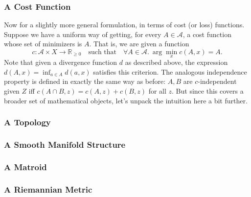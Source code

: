 \documentclass{article}
\begin{document}
\bigskip


\subsubsection*{A Cost Function}
Now for a slightly more general formulation, in terms of cost (or loss) functions.
Suppose we have a uniform way of getting, for every $A \in \mathcal A$, a cost function whose set of minimizers is $A$. That is, we are given a function
\[ c : \mathcal A \times X \to \mathbb R_{\ge 0}
\quad\text{such that}\quad
\forall A \in \mathcal A.~\arg\min_{x} c(A, x) = A.
\]
Note that given a divergence function $d$ as described above, the expression $d(A, x) = \inf_{a \in A} d(a,x)$ satisfies this criterion. The analogous independence property is defined in exactly the same way as before:
$A, B$ are $c$-independent given $Z$ iff $c(A \cap B, z) = c(A, z) + c(B, z)$ for all $z$.
But since this covers a broader set of mathematical objects, let's unpack the intuition here a bit further.

\TODO{}

\subsubsection*{A Topology}
\subsubsection*{A Smooth Manifold Structure}
\subsubsection*{A Matroid}
\subsubsection*{A Riemannian Metric}
\end{document}
